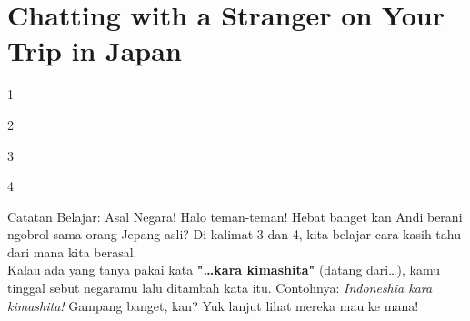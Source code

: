 ﻿\chapter{Chatting with a Stranger on Your Trip in Japan}

\begin{convobox}{1}
    \noindent
      
     

    \vspace{1.5em}
\end{convobox}

\begin{convobox}{2}
    \noindent
     

    \vspace{1.5em}
\end{convobox}

\begin{convobox}{3}
    \noindent
      
      
      

    \vspace{1.5em}
\end{convobox}

\begin{convobox}{4}
    \noindent
      

    \vspace{1.5em}
\end{convobox}

\begin{lessonbox}{Catatan Belajar: Asal Negara!}
    Halo teman-teman! Hebat banget kan Andi berani ngobrol sama orang Jepang asli? Di kalimat 3 dan 4, kita belajar cara kasih tahu dari mana kita berasal.\\
    
    Kalau ada yang tanya pakai kata \textbf{"\dots kara kimashita"} (datang dari\dots), kamu tinggal sebut negaramu lalu ditambah kata itu. Contohnya: \textit{Indoneshia kara kimashita!} Gampang banget, kan? Yuk lanjut lihat mereka mau ke mana!
\end{lessonbox}

